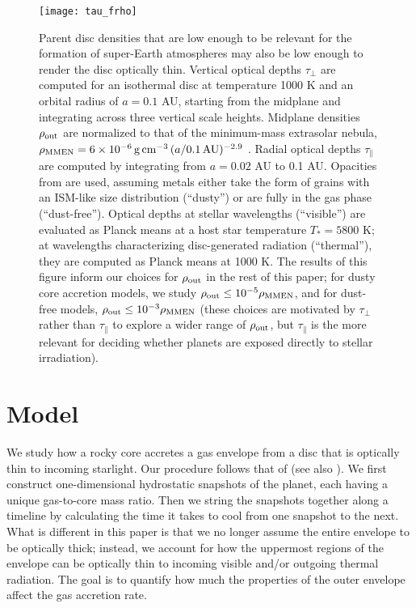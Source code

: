 \documentclass[fleqn,useAMS,usenatbib]{mnras}
\begin{document}
\begin{figure}
    \centering
    \texttt{[image: tau\_frho]}
    \caption{Parent disc densities 
    that are low enough to be relevant for
    the formation of super-Earth atmospheres \citep{paper1,paper3}
    may also be
    low enough to render the disc optically thin.
    Vertical optical depths $\tau_\perp$ are computed for an isothermal disc
    at temperature 1000 K and
    an orbital radius of $a = 0.1$ AU, starting from the midplane and integrating across three vertical scale heights.
    Midplane densities $\rho_{\rm out}$ are normalized to that of the minimum-mass extrasolar nebula, $\rho_{\rm MMEN} = 6\times 10^{-6}\,{\rm g\,cm^{-3}}\,(a/{\rm 0.1 \,AU})^{-2.9}$ \citep{chiang13}.
    Radial optical depths $\tau_\parallel$ are computed by integrating from $a = 0.02$ AU to 0.1 AU.
    Opacities from \citet{ferguson05} are used, assuming metals
    either take the form of grains with an ISM-like size distribution (``dusty'') or are fully in the gas phase (``dust-free'').
    Optical depths at stellar wavelengths
    (``visible'') are evaluated as Planck means at a host
    star temperature $T_\ast = 5800$ K; at wavelengths characterizing disc-generated radiation (``thermal''), they are computed as Planck means at 1000 K. The results of this figure inform our choices for
    $\rho_{\rm out}$ in the rest of this paper; for dusty core accretion
    models, we study $\rho_{\rm out} \leq 10^{-5} \rho_{\rm MMEN}$, and
    for dust-free models, $\rho_{\rm out} \leq 10^{-3} \rho_{\rm MMEN}$ 
    (these choices are motivated by $\tau_\perp$ rather than $\tau_\parallel$
    to explore a wider range of $\rho_{\rm out}$,
    but $\tau_\parallel$ is the more
    relevant for deciding whether planets are exposed directly to stellar
    irradiation).}
    \label{fig1}
\end{figure}

\section{Model}
\label{sec:model}

We study how a rocky core accretes a gas envelope from a disc
that is optically thin to incoming starlight.
Our procedure follows that of \citet{paper1} (see also \citealt{piso14}).
We first construct one-dimensional hydrostatic snapshots of the
planet, each having a unique gas-to-core mass ratio.
Then we string the snapshots together along a timeline
by calculating the time it takes to cool from one snapshot to the next.
What is different in this paper is that we no longer assume the entire
envelope to be optically thick; instead, we account
for how the uppermost regions of the envelope can be
optically thin to incoming visible and/or outgoing thermal
radiation. The goal is to quantify how much the properties of the outer
envelope affect the gas accretion rate.
\end{document}
